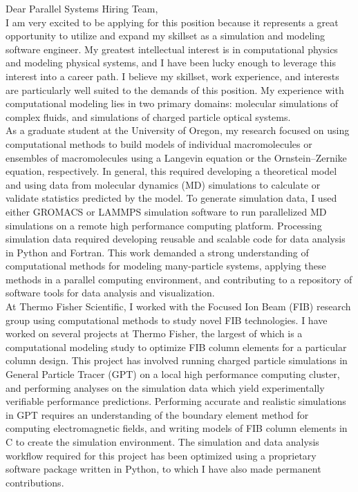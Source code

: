 \documentclass[]{letter}
\begin{document}

Dear Parallel Systems Hiring Team, \\

I am very excited to be applying for this position because it represents a great opportunity to utilize and expand my skillset as a simulation and modeling software engineer. My greatest intellectual interest is in computational physics and modeling physical systems, and I have been lucky enough to leverage this interest into a career path. I believe my skillset, work experience, and interests are particularly well suited to the demands of this position. My experience with computational modeling lies in two primary domains: molecular simulations of complex fluids, and simulations of charged particle optical systems. \\

As a graduate student at the University of Oregon, my research focused on using computational methods to build models of individual macromolecules or ensembles of macromolecules using a Langevin equation or the Ornstein–Zernike equation, respectively. In general, this required developing a theoretical model and using data from molecular dynamics (MD) simulations to calculate or validate statistics predicted by the model. To generate simulation data, I used either GROMACS or LAMMPS simulation software to run parallelized MD simulations on a remote high performance computing platform. Processing simulation data required developing reusable and scalable code for data analysis in Python and Fortran. This work demanded a strong understanding of computational methods for modeling many-particle systems, applying these methods in a parallel computing environment, and contributing to a repository of software tools for data analysis and visualization. \\

At Thermo Fisher Scientific, I worked with the Focused Ion Beam (FIB) research group using computational methods to study novel FIB technologies. I have worked on several projects at Thermo Fisher, the largest of which is a computational modeling study to optimize FIB column elements for a particular column design. This project has involved running charged particle simulations in General Particle Tracer (GPT) on a local high performance computing cluster, and performing analyses on the simulation data which yield experimentally verifiable performance predictions. Performing accurate and realistic simulations in GPT requires an understanding of the boundary element method for computing electromagnetic fields, and writing models of FIB column elements in C to create the simulation environment. The simulation and data analysis workflow required for this project has been optimized using a proprietary software package written in Python, to which I have also made permanent contributions. \\
\end{document}
